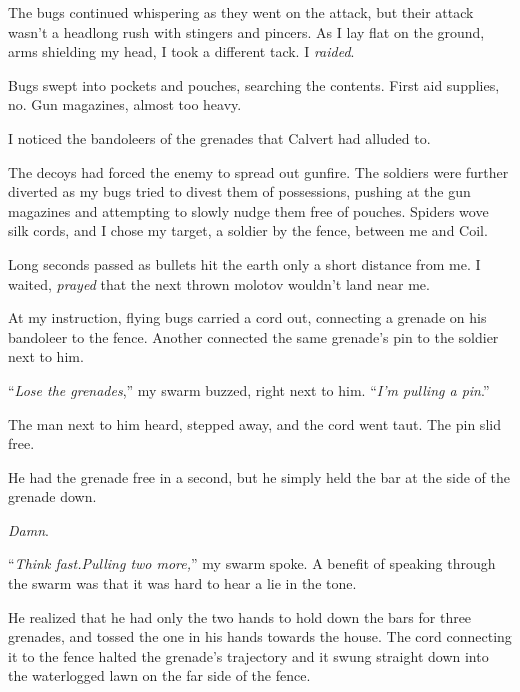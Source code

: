 The bugs continued whispering as they went on the attack, but their attack wasn't a headlong rush with stingers and pincers.  As I lay flat on the ground, arms shielding my head, I took a different tack.  I \emph{raided}.



Bugs swept into pockets and pouches, searching the contents.  First aid supplies, no.  Gun magazines, almost too heavy.



I noticed the bandoleers of the grenades that Calvert had alluded to.



The decoys had forced the enemy to spread out gunfire.  The soldiers were further diverted as my bugs tried to divest them of possessions, pushing at the gun magazines and attempting to slowly nudge them free of pouches.  Spiders wove silk cords, and I chose my target, a soldier by the fence, between me and Coil.



Long seconds passed as bullets hit the earth only a short distance from me.  I waited, \emph{prayed} that the next thrown molotov wouldn't land near me.



At my instruction, flying bugs carried a cord out, connecting a grenade on his bandoleer to the fence.  Another connected the same grenade's pin to the soldier next to him.



``\emph{Lose the grenades},'' my swarm buzzed, right next to him.  ``\emph{I'm pulling a pin}.''



The man next to him heard, stepped away, and the cord went taut.  The pin slid free.



He had the grenade free in a second, but he simply held the bar at the side of the grenade down.



\emph{Damn}.



``\emph{Think fast.}\emph{Pulling two more,}'' my swarm spoke.  A benefit of speaking through the swarm was that it was hard to hear a lie in the tone.



He realized that he had only the two hands to hold down the bars for three grenades, and tossed the one in his hands towards the house.  The cord connecting it to the fence halted the grenade's trajectory and it swung straight down into the waterlogged lawn on the far side of the fence.



